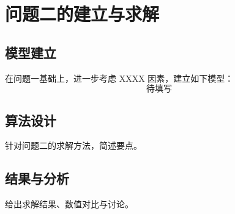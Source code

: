 \section{问题二的建立与求解}

\subsection{模型建立}
在问题一基础上，进一步考虑 XXXX 因素，建立如下模型：
\begin{equation}
    \text{待填写}
    \label{eq:model2}
\end{equation}

\subsection{算法设计}
针对问题二的求解方法，简述要点。

\subsection{结果与分析}
给出求解结果、数值对比与讨论。
